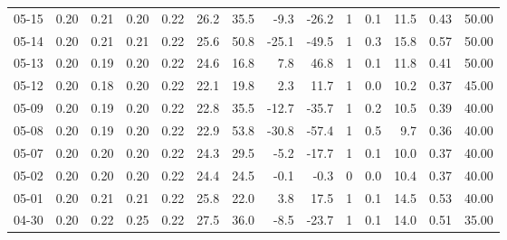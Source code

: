 \begin{threeparttable}
{\begin{tabular}{lrrrrrrrrrrrrr}
  05-15 &          0.20 &          0.21 &          0.20 &        0.22 &                26.2 &                35.5 &       -9.3 &        -26.2 &              1 &                 0.1 &             11.5 &            0.43 &                  50.00 \\
  05-14 &          0.20 &          0.21 &          0.21 &        0.22 &                25.6 &                50.8 &      -25.1 &        -49.5 &              1 &                 0.3 &             15.8 &            0.57 &                  50.00 \\
  05-13 &          0.20 &          0.19 &          0.20 &        0.22 &                24.6 &                16.8 &        7.8 &         46.8 &              1 &                 0.1 &             11.8 &            0.41 &                  50.00 \\
  05-12 &          0.20 &          0.18 &          0.20 &        0.22 &                22.1 &                19.8 &        2.3 &         11.7 &              1 &                 0.0 &             10.2 &            0.37 &                  45.00 \\
  05-09 &          0.20 &          0.19 &          0.20 &        0.22 &                22.8 &                35.5 &      -12.7 &        -35.7 &              1 &                 0.2 &             10.5 &            0.39 &                  40.00 \\
  05-08 &          0.20 &          0.19 &          0.20 &        0.22 &                22.9 &                53.8 &      -30.8 &        -57.4 &              1 &                 0.5 &              9.7 &            0.36 &                  40.00 \\
  05-07 &          0.20 &          0.20 &          0.20 &        0.22 &                24.3 &                29.5 &       -5.2 &        -17.7 &              1 &                 0.1 &             10.0 &            0.37 &                  40.00 \\
  05-02 &          0.20 &          0.20 &          0.20 &        0.22 &                24.4 &                24.5 &       -0.1 &         -0.3 &              0 &                 0.0 &             10.4 &            0.37 &                  40.00 \\
  05-01 &          0.20 &          0.21 &          0.21 &        0.22 &                25.8 &                22.0 &        3.8 &         17.5 &              1 &                 0.1 &             14.5 &            0.53 &                  40.00 \\
  04-30 &          0.20 &          0.22 &          0.25 &        0.22 &                27.5 &                36.0 &       -8.5 &        -23.7 &              1 &                 0.1 &             14.0 &            0.51 &                  35.00 \\

\end{tabular}}
\end{threeparttable}
